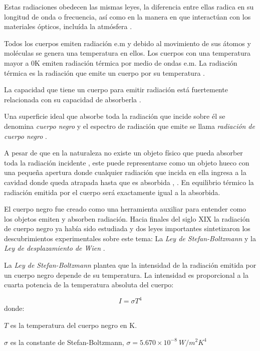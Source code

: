     Estas radiaciones obedecen las mismas leyes, la diferencia entre ellas radica en su longitud de onda o frecuencia, así como en la manera en que interactúan con los materiales ópticos, incluída la atmósfera \cite{Vincent}.
    
    Todos los cuerpos emiten radiación e.m  y debido al movimiento de sus átomos y moléculas se genera una temperatura en ellos. Los cuerpos con una temperatura mayor a 0K emiten radiación térmica por medio de ondas e.m. La radiación térmica es la radiación que emite un cuerpo por su temperatura \cite{Hollands}.
    
    La capacidad que tiene un cuerpo para emitir radiación está fuertemente relacionada con su capacidad de absorberla \cite{Beiser}.
    
    Una superficie ideal que absorbe toda la radiación que incide sobre él se denomina \textit{cuerpo negro} y el espectro de radiación que emite se llama \textit{radiación de cuerpo negro} \cite{Sears}.
    
    A pesar de que en la naturaleza no existe un objeto físico que pueda absorber toda la radiación incidente \cite{FUV3}, este puede representarse como un objeto hueco con una pequeña apertura donde cualquier radiación que incida en ella ingresa a la cavidad donde queda atrapada hasta que es absorbida \cite{Beiser}, \cite{FUV3}. En equilibrio térmico la radiación emitida por el cuerpo será exactamente igual a la absorbida.
    
    El cuerpo negro fue creado como una herramienta auxiliar para entender como los objetos emiten y absorben radiación.
    Hacia finales del siglo XIX la radiación de cuerpo negro ya había sido estudiada y dos leyes importantes sintetizaron los descubrimientos experimentales sobre este tema: La \textit{Ley de Stefan-Boltzmann} y la \textit{Ley de desplazamiento de Wien} \cite{FUV3}.
    
    La \textit{Ley de Stefan-Boltzmann} plantea que la intensidad de la radiación emitida por un cuerpo negro depende de su temperatura. La intensidad es proporcional a la cuarta potencia de la temperatura absoluta del cuerpo:
    
    \begin{equation}
        I = \sigma T^{4}
        \label{eq:Stefan-Boltzmann}
    \end{equation}
    donde:
    
    $T$ es la temperatura del cuerpo negro en K.
    
    $\sigma$ es la constante de Stefan-Boltzmann, $\sigma = 5.670\times10^{-8}\ W/m^{2}K^{4}$
    
